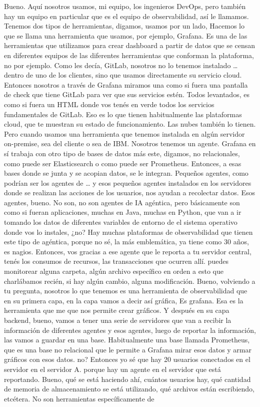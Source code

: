 \begin{description}[leftmargin=0cm, labelsep=0.5cm]
    \item[\textbf{VILLARINO PABLO RODOLFO:}] Bueno. Aquí nosotros usamos, mi equipo, los ingenieros DevOps, pero también hay un equipo en particular que es el equipo de observabilidad, así le llamamos. Tenemos dos tipos de herramientas, digamos, usamos por un lado, Hacemos lo que se llama una herramienta que usamos, por ejemplo, Grafana. Es una de las herramientas que utilizamos para crear dashboard a partir de datos que se censan en diferentes equipos de las diferentes herramientas que conforman la plataforma, no por ejemplo. Como les decía, GitLab, nosotros no lo tenemos instalado … dentro de uno de los clientes, sino que usamos directamente su servicio cloud. Entonces nosotros a través de Grafana miramos una como si fuera una pantalla de check que tiene GitLab para ver que sus servicios estén. Todos levantados, es como si fuera un HTML donde vos tenés en verde todos los servicios fundamentales de GitLab. Eso es lo que tienen habitualmente las plataformas cloud, que te muestran su estado de funcionamiento. Las nubes también lo tienen. Pero cuando usamos una herramienta que tenemos instalada en algún servidor on-premise, sea del cliente o sea de IBM. Nosotros tenemos un agente. Grafana en sí trabaja con otro tipo de bases de datos más este, digamos, no relacionales, como puede ser Elasticsearch o como puede ser Prometheus. Entonces, a esas bases donde se junta y se acopian datos, se le integran. Pequeños agentes, como podrían ser los agentes de … y esos pequeños agentes instalados en los servidores donde se realizan las acciones de los usuarios, nos ayudan a recolectar datos. Esos agentes, bueno. No son, no son agentes de IA agéntica, pero básicamente son como si fueran aplicaciones, muchas en Java, muchas en Python, que van a ir tomando los datos de diferentes variables de entorno de el sistema operativo donde vos lo instales, ¿no? Hay muchas plataformas de observabilidad que tienen este tipo de agéntica, porque no sé, la más emblemática, ya tiene como 30 años, es nagios. Entonces, vos gracias a ese agente que le reporta a tu servidor central, tenés los consumos de recursos, las transacciones que ocurren allí. puedes monitorear alguna carpeta, algún archivo específico en orden a esto que charlábamos recién, si hay algún cambio, alguna modificación. Bueno, volviendo a tu pregunta, nosotros lo que tenemos es una herramienta de observabilidad que en su primera capa, en la capa vamos a decir así gráfica, Es grafana. Esa es la herramienta que me que nos permite crear gráficos. Y después en su capa backend, bueno, vamos a tener una serie de servidores que van a recibir la información de diferentes agentes y esos agentes, luego de reportar la información, las vamos a guardar en una base. Habitualmente una base llamada Prometheus, que es una base no relacional que le permite a Grafana mirar esos datos y armar gráficos con esos datos. no? Entonces yo sé que hay 20 usuarios conectados en el servidor en el servidor A. porque hay un agente en el servidor que está reportando. Bueno, qué se está haciendo ahí, cuántos usuarios hay, qué cantidad de memoria de almacenamiento se está utilizando, qué archivos están escribiendo, etcétera. No son herramientas específicamente de 
\end{description}
